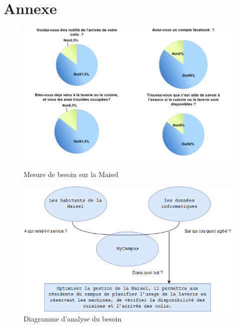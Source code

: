 \documentclass[12pt]{report}
\begin{document}
\clearpage

\section{Annexe}
\setcounter{figure}{0}  

\begin{figure}[h!]
\begin{center}
\includegraphics[scale=0.5]{stats.png}
\caption{Mesure de besoin sur la Maisel}
\end{center}
\end{figure}

\begin{figure}[h!]
\begin{center}
\includegraphics[scale=0.5]{analyse_besoin.png}
\caption{Diagramme d'analyse du besoin}
\end{center}
\end{figure}
\end{document}
